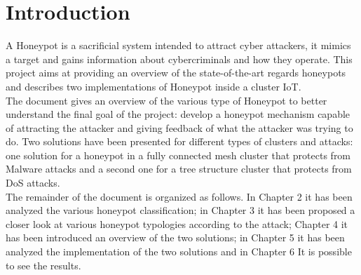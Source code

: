 \chapter{Introduction}
A Honeypot is a sacrificial system intended to attract cyber attackers, it mimics a target and gains
information about cybercriminals and how they operate. This project aims at providing an overview
of the state-of-the-art regards honeypots and describes two implementations of Honeypot inside a
cluster IoT.\\
The document gives an overview of the various type of Honeypot to better understand the final goal
of the project: develop a honeypot mechanism capable of attracting the attacker and giving feedback of
what the attacker was trying to do.
Two solutions have been presented for different types of clusters and attacks: one solution for a honeypot
in a fully connected mesh cluster that protects from Malware attacks and a second one for a tree structure cluster that protects from DoS attacks.\\
The remainder of the document is organized as follows. In Chapter 2 it has been analyzed the various
honeypot classification; in Chapter 3 it has been proposed a closer look at various honeypot typologies
according to the attack; Chapter 4  it has been introduced an overview of the two solutions; in
Chapter 5  it has been analyzed the implementation of the two solutions and in Chapter 6 It is possible to see the results.

